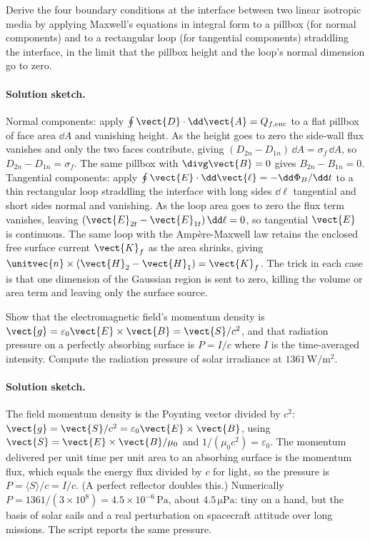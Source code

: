 \begin{exercise}
Derive the four boundary conditions at the interface between two
linear isotropic media by applying Maxwell's equations in integral
form to a pillbox (for normal components) and to a rectangular loop
(for tangential components) straddling the interface, in the limit
that the pillbox height and the loop's normal dimension go to zero.

\paragraph{Solution sketch.} Normal components: apply $\oint\vect{D}\cdot
\dd\vect{A} = Q_{f,\text{enc}}$ to a flat pillbox of face area $\dd A$
and vanishing height. As the height goes to zero the side-wall flux
vanishes and only the two faces contribute, giving $(D_{2n} - D_{1n})
\,\dd A = \sigma_f\,\dd A$, so $D_{2n} - D_{1n} = \sigma_f$. The same
pillbox with $\divg\vect{B}=0$ gives $B_{2n} - B_{1n} = 0$. Tangential
components: apply $\oint\vect{E}\cdot\dd\vect{\ell} = -\dd\Phi_B/\dd t$
to a thin rectangular loop straddling the interface with long sides
$\dd\ell$ tangential and short sides normal and vanishing. As the loop
area goes to zero the flux term vanishes, leaving $(\vect{E}_{2t} -
\vect{E}_{1t})\,\dd\ell = 0$, so tangential $\vect{E}$ is continuous.
The same loop with the Amp\`ere-Maxwell law retains the enclosed free
surface current $\vect{K}_f$ as the area shrinks, giving $\unitvec{n}
\times(\vect{H}_2 - \vect{H}_1) = \vect{K}_f$. The trick in each case is
that one dimension of the Gaussian region is sent to zero, killing the
volume or area term and leaving only the surface source.
\end{exercise}

\begin{exercise}
Show that the electromagnetic field's momentum density is
$\vect{g} = \varepsilon_{0}\vect{E}\times \vect{B} = \vect{S}/c^{2}$,
and that radiation pressure on a perfectly absorbing surface is
$P = I/c$ where $I$ is the time-averaged intensity. Compute the
radiation pressure of solar irradiance at $1361\,\si{\watt\per\meter
\squared}$.

\paragraph{Solution sketch.} The field momentum density is the Poynting
vector divided by $c^2$: $\vect{g} = \vect{S}/c^2 = \varepsilon_0
\vect{E}\times\vect{B}$, using $\vect{S} = \vect{E}\times\vect{B}/\mu_0$
and $1/(\mu_0 c^2) = \varepsilon_0$. The momentum delivered per unit
time per unit area to an absorbing surface is the momentum flux, which
equals the energy flux divided by $c$ for light, so the pressure is
$P = \langle S\rangle/c = I/c$. (A perfect reflector doubles this.)
Numerically $P = 1361/(3\times 10^8) = 4.5\times 10^{-6}\,\si{\pascal}$,
about $4.5\,\si{\micro\pascal}$: tiny on a hand, but the basis of solar
sails and a real perturbation on spacecraft attitude over long
missions. The script  reports the same
pressure.
\end{exercise}

